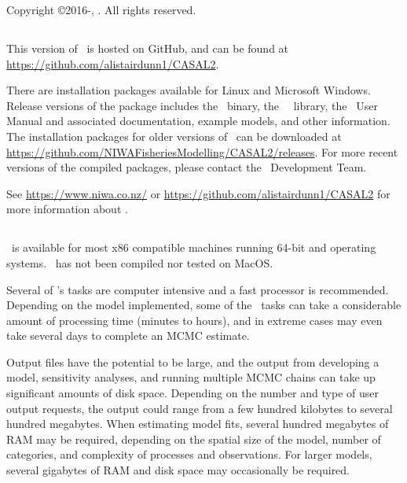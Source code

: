 Copyright \copyright 2016-\SourceControlYearDoc, \href{https://www.niwa.co.nz}{\Organisation}. All rights reserved.

\subsection{}

This version of \CNAME\ is hosted on GitHub, and can be found at \url{https://github.com/alistairdunn1/CASAL2}.

There are installation packages available for Linux and Microsoft Windows. Release versions of the package includes the \CNAME\ binary, the \CNAME\ \R\ library, the \CNAME\ User Manual and associated documentation, example models, and other information. The installation packages for older versions of \CNAME\ can be downloaded at \url{https://github.com/NIWAFisheriesModelling/CASAL2/releases}. For more recent versions of the compiled packages, please contact the \CNAME\ Development Team. 

See \url{https://www.niwa.co.nz/} or \url{https://github.com/alistairdunn1/CASAL2} for more information about \CNAME.

\subsection{}

\CNAME\ is available for most x86 compatible machines running 64-bit  and  operating systems. \CNAME\ has not been compiled nor tested on MacOS.

Several of \CNAME's tasks are computer intensive and a fast processor is recommended. Depending on the model implemented, some of the \CNAME\ tasks can take a considerable amount of processing time (minutes to hours), and in extreme cases may even take several days to complete an MCMC estimate.

Output files have the potential to be large, and the output from developing a model, sensitivity analyses, and running multiple MCMC chains can take up significant amounts of disk space. Depending on the number and type of user output requests, the output could range from a few hundred kilobytes to several hundred megabytes. When estimating model fits, several hundred megabytes of RAM may be required, depending on the spatial size of the model, number of categories, and complexity of processes and observations. For larger models, several gigabytes of RAM and disk space may occasionally be required.

